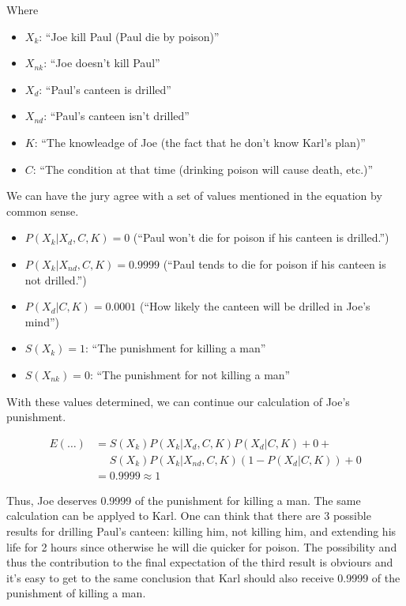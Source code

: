 \documentclass{manuscript}
\begin{document}
    Where

    \begin{itemize}[label={}, itemsep=0.1em]
        \item $X_k$: ``Joe kill Paul (Paul die by poison)''
        \item $X_{nk}$: ``Joe doesn't kill Paul''
        \item $X_d$: ``Paul's canteen is drilled''
        \item $X_{nd}$: ``Paul's canteen isn't drilled''
        \item $K$: ``The knowleadge of Joe (the fact that he don't know Karl's plan)''
        \item $C$: ``The condition at that time (drinking poison will cause death, etc.)''
    \end{itemize}

    We can have the jury agree with a set of values mentioned in the equation by common sense.

    \begin{itemize}[label={}, itemsep=0.1em]
        \item $P(X_k|X_d,C,K) = 0$ (``Paul won't die for poison if his canteen is drilled.'')
        \item $P(X_k|X_{nd},C,K) = 0.9999$ (``Paul tends to die for poison if his canteen is not drilled.'')
        \item $P(X_d|C, K) = 0.0001$ (``How likely the canteen will be drilled in Joe's mind'')
        \item $S(X_k) = 1$: ``The punishment for killing a man''
        \item $S(X_{nk}) = 0$: ``The punishment for not killing a man''
    \end{itemize}

    With these values determined, we can continue our calculation of Joe's punishment.

    $$\begin{aligned}
        E(\text{\ldots}) &= S(X_k)P(X_k|X_d,C,K)P(X_d|C,K) + 0 + {} \\
                         &\phantom{{}={}} S(X_k)P(X_k|X_{nd},C,K)(1-P(X_d|C,K)) + 0 \\
                         &= 0.9999 \approx 1
    \end{aligned}$$

    Thus, Joe deserves 0.9999 of the punishment for killing a man. The same calculation can be applyed to Karl. One can
    think that there are 3 possible results for drilling Paul's canteen: killing him, not killing him, and extending his
    life for 2 hours since otherwise he will die quicker for poison. The possibility and thus the contribution to the
    final expectation of the third result is obviours and it's easy to get to the same conclusion that Karl should also
    receive 0.9999 of the punishment of killing a man.
\end{document}

